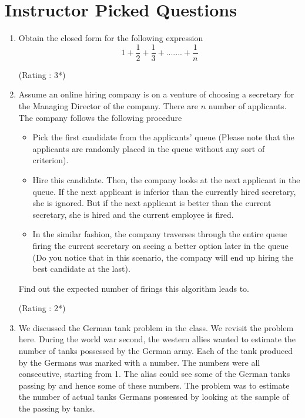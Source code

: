 \documentclass[paper=a4, fontsize=11pt]{scrartcl} %
\numberwithin{equation}{section} %
\numberwithin{figure}{section} %
\numberwithin{table}{section} %
\begin{document}
\section{Instructor Picked Questions}
\begin{enumerate}
\item Obtain the closed form for the following expression  \\ 
$$1 + \frac{1}{2} + \frac{1}{3} + ....... + \frac{1}{n}$$ 
  \begin{flushright}
\small{(Rating : 3*)}
\end{flushright} 
\vspace{1cm}

\item Assume an online hiring company is on a venture of choosing a secretary for the Managing Director of the company. There are $n$ number of applicants. The company follows the following procedure\\
\begin{itemize}
\item Pick the first candidate from the applicants' queue (Please note that the applicants are randomly placed in the queue without any sort of criterion).
\item Hire this candidate. Then, the company looks at the next applicant in the queue. If the next applicant is inferior than the currently hired secretary, she is ignored. But if the next applicant is better than the current secretary, she is hired and the current employee is fired. 
\item In the similar fashion, the company traverses through the entire queue firing the current secretary on seeing a better option later in the queue (Do you notice that in this scenario, the company will end up hiring the best candidate at the last). 
\end{itemize}
Find out the expected number of firings this algorithm leads to.
\begin{flushright}
\small{(Rating : 2*)}
\end{flushright} 
\vspace{0.2cm}

\item We discussed the German tank problem in the class. We revisit the problem here. During the world war second, the western allies wanted to estimate the number of tanks possessed by the German army. Each of the tank produced by the Germans was marked with a number. The numbers were all consecutive, starting from 1. The alias could see some of the German tanks passing by and hence some of these numbers. The problem was to estimate the number of actual tanks Germans possessed by looking at the sample of the passing by tanks. \\


\end{enumerate}
\end{document}
